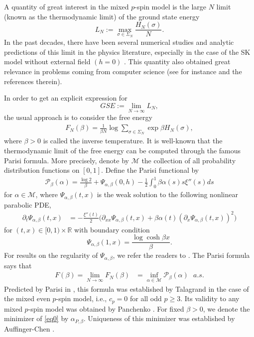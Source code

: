 \documentclass[12pt]{article}
\newenvironment{Proof of lemma}{\noindent{\bf Proof of Lemma}}{\hfill$\Box$\newline}
\newenvironment{Proof of theorem}{\noindent{\bf Proof of Theorem}}{\hfill{\footnotesize${\square}$}\newline}
\newenvironment{Proof of theorems}{\noindent{\bf Proof of Theorems}}{\hfill$\Box$\newline}
\newenvironment{Proof of proposition}{\noindent{\bf Proof of Proposition}}{\hfill$\Box$\newline}
\newenvironment{Proof of propositions}{\noindent{\bf Proof of Propositions}}{\hfill$\Box$\newline}
\newenvironment{Proof of exercise}{\noindent{\it Proof of Exercise:}}{\hfill$\Box$}
\begin{document}
A quantity of great interest in the mixed $p$-spin model is the large $N$ limit (known as the thermodynamic limit) of the ground state energy 
$$
L_N:=\max_{\sigma\in\Sigma_N}\frac{H_N(\sigma)}{N}.
$$
In the past decades, there have been several numerical studies and analytic predictions of this limit in the physics literature, especially in the case of the SK model without external field $(h=0)$ \cite{CR02, KLL, OS1, OS2, Pankov}. This quantity also obtained great relevance in problems coming from computer science (see for instance \cite{DemboMontanariSen, MMbook} and the references therein).

 In order to get an explicit expression  for 
 $$ GSE:=\lim_{N\rightarrow\infty}L_N,$$ the  usual approach is to consider the free energy
\begin{align*}
F_N(\beta)=\frac{1}{\beta N}\log \sum_{\sigma\in\Sigma_N}\exp \beta H_N(\sigma),
\end{align*}
where $\beta>0$ is called the inverse temperature. It is well-known that the thermodynamic limit  of the free energy can be computed through the famous Parisi formula. More precisely, denote by $\mathcal{M}$ the collection of all probability distribution functions on $[0,1]$. Define the Parisi functional by
\begin{align*}
\mathcal{P}_{\beta}(\alpha)=\frac{\log 2}{\beta}+\Psi_{\alpha,\beta}(0,h)-\frac{1}{2}\int_0^1\beta\alpha(s)s\xi''(s)ds
\end{align*}
for $\alpha\in\mathcal{M}$, where $\Psi_{\alpha,\beta}(t,x)$ is the weak solution to the following nonlinear parabolic PDE,
\begin{align}\label{pde}
\partial_t\Psi_{\alpha,\beta}(t,x)&=-\frac{\xi''(t)}{2}\bigl(\partial_{xx}\Psi_{\alpha,\beta}(t,x)+\beta\alpha(t)(\partial_x\Psi_{\alpha,\beta}(t,x))^2\bigr)
\end{align} 
for $(t,x)\in[0,1)\times\mathbb{R}$ with boundary condition
$$
\Psi_{\alpha,\beta}(1,x)=\frac{\log \cosh \beta x}{\beta}.
$$
For results on the regularity of $\Psi_{\alpha,\beta}$, we refer the readers to \cite{AC13,JT2}. The Parisi formula says that 
\begin{align}\label{eq0}
F(\beta)=\lim_{N\rightarrow\infty}F_N(\beta)&=\inf_{\alpha\in\mathcal{M}}\mathcal{P}_\beta(\alpha) \,\,\,\,a.s.
\end{align}
Predicted by Parisi in \cite{Parisi}, this formula was  established by Talagrand \cite{Talagrand} in the case of the mixed even $p$-spin model, i.e., $c_p=0$ for all odd $p\geq 3$. Its validity to any mixed $p$-spin model was obtained by Panchenko \cite{Panchenko}. For fixed $\beta >0$, we denote the minimizer of \eqref{eq0} by $\alpha_{P,\beta}$. Uniqueness of this minimizer was established by Auffinger-Chen \cite{AC14}.
\end{document}
